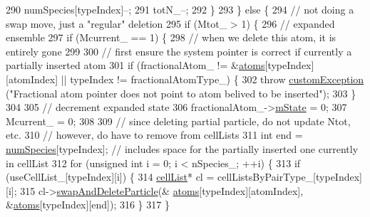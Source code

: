 \begin{DoxyCode}
290                     numSpecies[typeIndex]--;
291                     totN\_--;
292                 \}
293             \} \textcolor{keywordflow}{else} \{
294                 \textcolor{comment}{// not doing a swap move, just a "regular" deletion}
295                 \textcolor{keywordflow}{if} (Mtot\_ > 1) \{
296                     \textcolor{comment}{// expanded ensemble}
297                     \textcolor{keywordflow}{if} (Mcurrent\_ == 1) \{
298                         \textcolor{comment}{// when we delete this atom, it is entirely gone}
299 
300                         \textcolor{comment}{// first ensure the system pointer is correct if currently a partially inserted
       atom}
301                         \textcolor{keywordflow}{if} (fractionalAtom\_ != &\hyperlink{classsim_system_a90421b19082f7fb8fc23b7264b1161e4}{atoms}[typeIndex][atomIndex] || typeIndex != 
      fractionalAtomType\_) \{
302                             \textcolor{keywordflow}{throw} \hyperlink{classcustom_exception}{customException} (\textcolor{stringliteral}{"Fractional atom pointer does not point
       to atom belived to be inserted"});
303                         \}
304 
305                         \textcolor{comment}{// decrement expanded state}
306                         fractionalAtom\_->\hyperlink{classatom_a3cb00c0c5b7533657e05af6ff4a42740}{mState} = 0;
307                         Mcurrent\_ = 0;
308 
309                         \textcolor{comment}{// since deleting partial particle, do not update Ntot, etc.}
310                         \textcolor{comment}{// however, do have to remove from cellLists}
311                         \textcolor{keywordtype}{int} end = \hyperlink{classsim_system_a9eea865e6dc1cff377b1e79c4d9c23f0}{numSpecies}[typeIndex]; \textcolor{comment}{// includes space for the partially
       inserted one currently in cellList}
312                         \textcolor{keywordflow}{for} (\textcolor{keywordtype}{unsigned} \textcolor{keywordtype}{int} i = 0; i < nSpecies\_; ++i) \{
313                             \textcolor{keywordflow}{if} (useCellList\_[typeIndex][i]) \{
314                                 \hyperlink{classcell_list}{cellList}* cl = cellListsByPairType\_[typeIndex][i];
315                                 cl->\hyperlink{classcell_list_a31caca1e8dd05c33215ac7495d55aeea}{swapAndDeleteParticle}(&
      \hyperlink{classsim_system_a90421b19082f7fb8fc23b7264b1161e4}{atoms}[typeIndex][atomIndex], &\hyperlink{classsim_system_a90421b19082f7fb8fc23b7264b1161e4}{atoms}[typeIndex][end]);
316                             \}
317                         \}

\end{DoxyCode}
